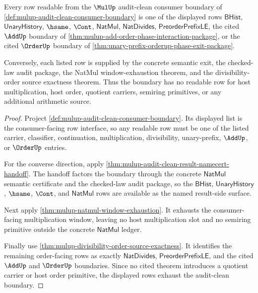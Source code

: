 \begin{theorem}
\label{thm:mulup-audit-clean-boundary-row-exhaustion}
Every row readable from the $\MulUp$ audit-clean consumer boundary of
\autoref{def:mulup-audit-clean-consumer-boundary} is one of the displayed rows
$\mathsf{BHist}$, $\mathsf{UnaryHistory}$, $\hsame$, $\Cont$,
$\mathsf{NatMul}$, $\mathsf{NatDivides}$, $\mathsf{PreorderPrefixLE}$, the
cited $\AddUp$ boundary of
\autoref{thm:mulup-add-order-phase-interaction-package}, or the cited
$\OrderUp$ boundary of
\autoref{thm:unary-prefix-orderup-phase-exit-package}.

Conversely, each listed row is supplied by the concrete semantic exit, the
checked-law audit package, the NatMul window-exhaustion theorem, and the
divisibility-order source exactness theorem. Thus the boundary has no readable
row for host multiplication, host order, quotient carriers, semiring
primitives, or any additional arithmetic source.
\end{theorem}
\begin{proof}
Project \autoref{def:mulup-audit-clean-consumer-boundary}. Its displayed list is
the consumer-facing row interface, so any readable row must be one of the
listed carrier, classifier, continuation, multiplication, divisibility,
unary-prefix, $\AddUp$, or $\OrderUp$ entries.

For the converse direction, apply
\autoref{thm:mulup-audit-clean-result-namecert-handoff}. The handoff factors
the boundary through the concrete $\mathsf{NatMul}$ semantic certificate and
the checked-law audit package, so the $\mathsf{BHist}$,
$\mathsf{UnaryHistory}$, $\hsame$, $\Cont$, and $\mathsf{NatMul}$ rows are
available as the named result-side surface.

Next apply \autoref{thm:mulup-natmul-window-exhaustion}. It exhausts the
consumer-facing multiplication window, leaving no host multiplication slot and
no semiring primitive outside the concrete $\mathsf{NatMul}$ ledger.

Finally use \autoref{thm:mulup-divisibility-order-source-exactness}. It
identifies the remaining order-facing rows as exactly $\mathsf{NatDivides}$,
$\mathsf{PreorderPrefixLE}$, and the cited $\AddUp$ and $\OrderUp$ boundaries.
Since no cited theorem introduces a quotient carrier or host order primitive,
the displayed rows exhaust the audit-clean boundary.
\end{proof}
